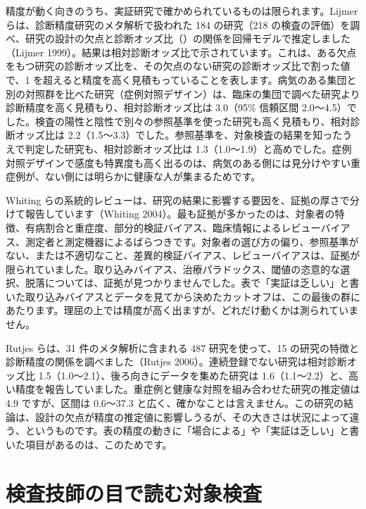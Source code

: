 \begin{hattenbox}
精度が動く向きのうち、実証研究で確かめられているものは限られます。Lijmer らは、診断精度研究のメタ解析で扱われた 184 の研究（218 の検査の評価）を調べ、研究の設計の欠点と診断オッズ比（）の関係を回帰モデルで推定しました（Lijmer 1999）。結果は相対診断オッズ比で示されています。これは、ある欠点をもつ研究の診断オッズ比を、その欠点のない研究の診断オッズ比で割った値で、1 を超えると精度を高く見積もっていることを表します。病気のある集団と別の対照群を比べた研究（症例対照デザイン）は、臨床の集団で調べた研究より診断精度を高く見積もり、相対診断オッズ比は 3.0（95\% 信頼区間 2.0〜4.5）でした。検査の陽性と陰性で別々の参照基準を使った研究も高く見積もり、相対診断オッズ比は 2.2（1.5〜3.3）でした。参照基準を、対象検査の結果を知ったうえで判定した研究も、相対診断オッズ比は 1.3（1.0〜1.9）と高めでした。症例対照デザインで感度も特異度も高く出るのは、病気のある側には見分けやすい重症例が、ない側には明らかに健康な人が集まるためです。

Whiting らの系統的レビューは、研究の結果に影響する要因を、証拠の厚さで分けて報告しています（Whiting 2004）。最も証拠が多かったのは、対象者の特徴、有病割合と重症度、部分的検証バイアス、臨床情報によるレビューバイアス、測定者と測定機器によるばらつきです。対象者の選び方の偏り、参照基準がない、または不適切なこと、差異的検証バイアス、レビューバイアスは、証拠が限られていました。取り込みバイアス、治療パラドックス、閾値の恣意的な選択、脱落については、証拠が見つかりませんでした。表で「実証は乏しい」と書いた取り込みバイアスとデータを見てから決めたカットオフは、この最後の群にあたります。理屈の上では精度が高く出ますが、どれだけ動くかは測られていません。

Rutjes らは、31 件のメタ解析に含まれる 487 研究を使って、15 の研究の特徴と診断精度の関係を調べました（Rutjes 2006）。連続登録でない研究は相対診断オッズ比 1.5（1.0〜2.1）、後ろ向きにデータを集めた研究は 1.6（1.1〜2.2）と、高い精度を報告していました。重症例と健康な対照を組み合わせた研究の推定値は 4.9 ですが、区間は 0.6〜37.3 と広く、確かなことは言えません。この研究の結論は、設計の欠点が精度の推定値に影響しうるが、その大きさは状況によって違う、というものです。表の精度の動きに「場合による」や「実証は乏しい」と書いた項目があるのは、このためです。
\end{hattenbox}

\section{検査技師の目で読む対象検査}
\label{sec:12-6}

